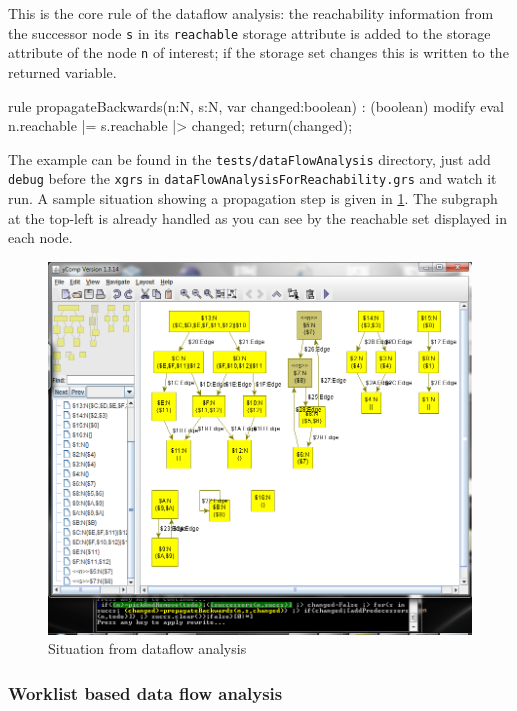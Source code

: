   \begin{example}
This is the core rule of the dataflow analysis: the reachability information from the successor node \texttt{s} in its \texttt{reachable} storage attribute is added to the storage attribute of the node \texttt{n} of interest; if the storage set changes this is written to the returned variable.
    \begin{grgen}
rule propagateBackwards(n:N, s:N, var changed:boolean) : (boolean)
{
  modify {
    eval { n.reachable |= s.reachable |> changed; }
    return(changed);
  }
}
    \end{grgen}
  \end{example}
  
The example can be found in the \texttt{tests/dataFlowAnalysis} directory, just add \texttt{debug} before the \texttt{xgrs} in \texttt{dataFlowAnalysisForReachability.grs} and watch it run.
A sample situation showing a propagation step is given in \ref{figdataflow}.
The subgraph at the top-left is already handled as you can see by the reachable set displayed in each node.

\begin{figure}[htbp]
  \centering
  \includegraphics[width=\textwidth]{fig/Dataflow}
  \caption{Situation from dataflow analysis}
  \label{figdataflow}
\end{figure}

\subsubsection*{Worklist based data flow analysis}

